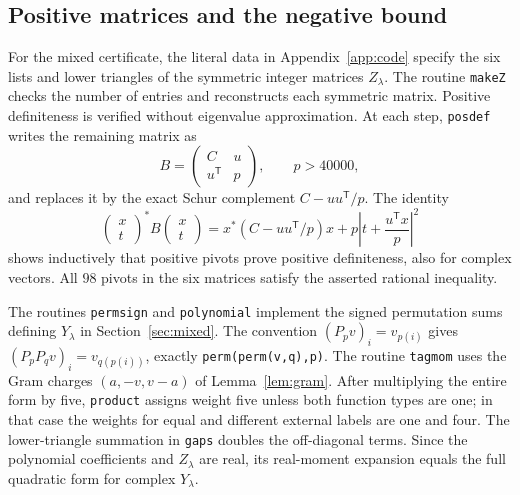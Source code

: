 \subsection{Positive matrices and the negative bound}

For the mixed certificate, the literal data in Appendix~\ref{app:code}
specify the six lists and lower triangles of the symmetric integer
matrices $Z_\lambda$.  The routine \texttt{makeZ} checks the number of
entries and reconstructs each symmetric matrix.  Positive definiteness
is verified without eigenvalue approximation.  At each step,
\texttt{posdef} writes the remaining matrix as
\[
 B=\begin{pmatrix}C&u\\u^{\mathsf T}&p\end{pmatrix},
 \qquad p>40000,
\]
and replaces it by the exact Schur complement $C-uu^{\mathsf T}/p$.
The identity
\[
 \begin{pmatrix}x\\t\end{pmatrix}^{\!*}
 B\begin{pmatrix}x\\t\end{pmatrix}
 =x^*(C-uu^{\mathsf T}/p)x
   +p\left|t+\frac{u^{\mathsf T}x}{p}\right|^2
\]
shows inductively that positive pivots prove positive definiteness,
also for complex vectors.  All $98$ pivots in the six matrices satisfy
the asserted rational inequality.

The routines \texttt{permsign} and \texttt{polynomial} implement the
signed permutation sums defining $Y_\lambda$ in
Section~\ref{sec:mixed}.  The convention
$(P_pv)_i=v_{p(i)}$ gives
$(P_pP_qv)_i=v_{q(p(i))}$, exactly
\texttt{perm(perm(v,q),p)}.  The routine \texttt{tagmom} uses the Gram
charges $(a,-v,v-a)$ of Lemma~\ref{lem:gram}.  After multiplying the
entire form by five, \texttt{product} assigns weight five unless both
function types are one; in that case the weights for equal and
different external labels are one and four.  The lower-triangle
summation in \texttt{gaps} doubles the off-diagonal terms.  Since the
polynomial coefficients and $Z_\lambda$ are real, its real-moment
expansion equals the full quadratic form for complex $Y_\lambda$.

